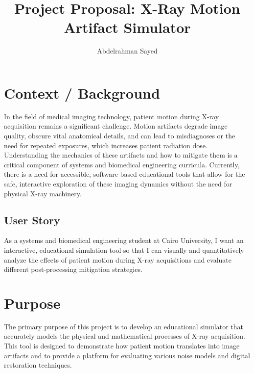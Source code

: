 \documentclass[12pt,a4paper]{article}
\title{\textbf{Project Proposal: X-Ray Motion Artifact Simulator}}
\author{Abdelrahman Sayed}
\date{}
\begin{document}
\maketitle

\section{Context / Background}
In the field of medical imaging technology, patient motion during X-ray acquisition remains a significant challenge. Motion artifacts degrade image quality, obscure vital anatomical details, and can lead to misdiagnoses or the need for repeated exposures, which increases patient radiation dose. Understanding the mechanics of these artifacts and how to mitigate them is a critical component of systems and biomedical engineering curricula. Currently, there is a need for accessible, software-based educational tools that allow for the safe, interactive exploration of these imaging dynamics without the need for physical X-ray machinery.

\subsection{User Story}
As a systems and biomedical engineering student at Cairo University, I want an interactive, educational simulation tool so that I can visually and quantitatively analyze the effects of patient motion during X-ray acquisitions and evaluate different post-processing mitigation strategies.

\section{Purpose}
The primary purpose of this project is to develop an educational simulator that accurately models the physical and mathematical processes of X-ray acquisition. This tool is designed to demonstrate how patient motion translates into image artifacts and to provide a platform for evaluating various noise models and digital restoration techniques.
\end{document}
